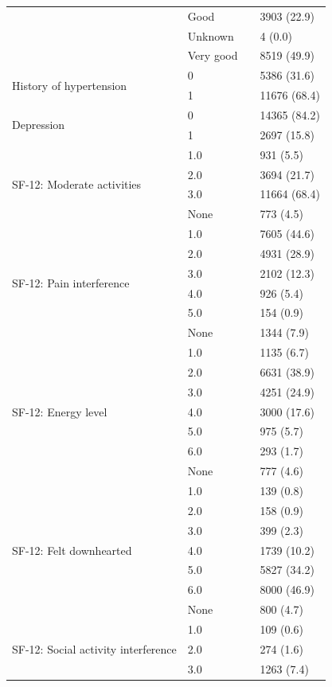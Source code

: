 \begin{tabular}{llll}
 & Good &  & 3903 (22.9) \\
 & Unknown &  & 4 (0.0) \\
 & Very good &  & 8519 (49.9) \\
\cline{1-4}
\multirow[t]{2}{*}{History of hypertension} & 0 &  & 5386 (31.6) \\
 & 1 &  & 11676 (68.4) \\
\cline{1-4}
\multirow[t]{2}{*}{Depression} & 0 &  & 14365 (84.2) \\
 & 1 &  & 2697 (15.8) \\
\cline{1-4}
\multirow[t]{4}{*}{SF-12: Moderate activities} & 1.0 &  & 931 (5.5) \\
 & 2.0 &  & 3694 (21.7) \\
 & 3.0 &  & 11664 (68.4) \\
 & None &  & 773 (4.5) \\
\cline{1-4}
\multirow[t]{6}{*}{SF-12: Pain interference} & 1.0 &  & 7605 (44.6) \\
 & 2.0 &  & 4931 (28.9) \\
 & 3.0 &  & 2102 (12.3) \\
 & 4.0 &  & 926 (5.4) \\
 & 5.0 &  & 154 (0.9) \\
 & None &  & 1344 (7.9) \\
\cline{1-4}
\multirow[t]{7}{*}{SF-12: Energy level} & 1.0 &  & 1135 (6.7) \\
 & 2.0 &  & 6631 (38.9) \\
 & 3.0 &  & 4251 (24.9) \\
 & 4.0 &  & 3000 (17.6) \\
 & 5.0 &  & 975 (5.7) \\
 & 6.0 &  & 293 (1.7) \\
 & None &  & 777 (4.6) \\
\cline{1-4}
\multirow[t]{7}{*}{SF-12: Felt downhearted} & 1.0 &  & 139 (0.8) \\
 & 2.0 &  & 158 (0.9) \\
 & 3.0 &  & 399 (2.3) \\
 & 4.0 &  & 1739 (10.2) \\
 & 5.0 &  & 5827 (34.2) \\
 & 6.0 &  & 8000 (46.9) \\
 & None &  & 800 (4.7) \\
\cline{1-4}
\multirow[t]{6}{*}{SF-12: Social activity interference} & 1.0 &  & 109 (0.6) \\
 & 2.0 &  & 274 (1.6) \\
 & 3.0 &  & 1263 (7.4) \\

\end{tabular}
